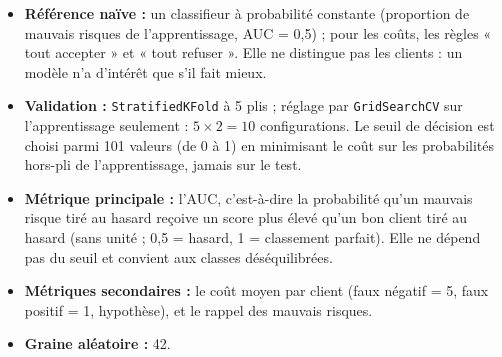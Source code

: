 \documentclass[11pt,a4paper]{article}
\begin{document}
\begin{itemize}
  \item \textbf{Référence naïve :} un classifieur à probabilité constante (proportion de mauvais risques de l'apprentissage, AUC = 0,5) ; pour les coûts, les règles « tout accepter » et « tout refuser ». Elle ne distingue pas les clients : un modèle n'a d'intérêt que s'il fait mieux.
  \item \textbf{Validation :} \texttt{StratifiedKFold} à 5 plis ; réglage par \texttt{GridSearchCV} sur l'apprentissage seulement : $5 \times 2 = 10$ configurations. Le seuil de décision est choisi parmi 101 valeurs (de 0 à 1) en minimisant le coût sur les probabilités hors-pli de l'apprentissage, jamais sur le test.
  \item \textbf{Métrique principale :} l'AUC, c'est-à-dire la probabilité qu'un mauvais risque tiré au hasard reçoive un score plus élevé qu'un bon client tiré au hasard (sans unité ; 0,5 = hasard, 1 = classement parfait). Elle ne dépend pas du seuil et convient aux classes déséquilibrées.
  \item \textbf{Métriques secondaires :} le coût moyen par client (faux négatif = 5, faux positif = 1, hypothèse), et le rappel des mauvais risques.
  \item \textbf{Graine aléatoire :} 42.
\end{itemize}

\end{document}

